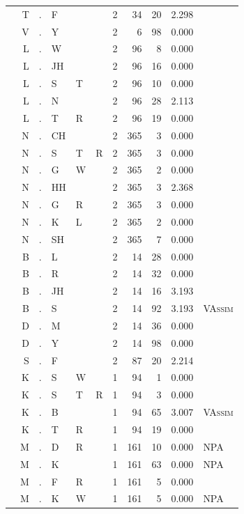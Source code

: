 \documentclass[12pt]{article}
\begin{document}
\begin{longtable}{r@{ } r@{ } c@{ } l@{ } l@{ } l@{ } r r r r l }
 & T & . & F &  &  & 2 & 34 & 20 & 2.298 &  \\
 & V & . & Y &  &  & 2 & 6 & 98 & 0.000 &  \\
 & L & . & W &  &  & 2 & 96 & 8 & 0.000 &  \\
 & L & . & JH &  &  & 2 & 96 & 16 & 0.000 &  \\
 & L & . & S & T &  & 2 & 96 & 10 & 0.000 &  \\
 & L & . & N &  &  & 2 & 96 & 28 & 2.113 &  \\
 & L & . & T & R &  & 2 & 96 & 19 & 0.000 &  \\
 & N & . & CH &  &  & 2 & 365 & 3 & 0.000 &  \\
 & N & . & S & T & R & 2 & 365 & 3 & 0.000 &  \\
 & N & . & G & W &  & 2 & 365 & 2 & 0.000 &  \\
 & N & . & HH &  &  & 2 & 365 & 3 & 2.368 &  \\
 & N & . & G & R &  & 2 & 365 & 3 & 0.000 &  \\
 & N & . & K & L &  & 2 & 365 & 2 & 0.000 &  \\
 & N & . & SH &  &  & 2 & 365 & 7 & 0.000 &  \\
 & B & . & L &  &  & 2 & 14 & 28 & 0.000 &  \\
 & B & . & R &  &  & 2 & 14 & 32 & 0.000 &  \\
 & B & . & JH &  &  & 2 & 14 & 16 & 3.193 &  \\
 & B & . & S &  &  & 2 & 14 & 92 & 3.193 & \textsc{VAssim} \\
 & D & . & M &  &  & 2 & 14 & 36 & 0.000 &  \\
 & D & . & Y &  &  & 2 & 14 & 98 & 0.000 &  \\
 & S & . & F &  &  & 2 & 87 & 20 & 2.214 &  \\
 & K & . & S & W &  & 1 & 94 & 1 & 0.000 &  \\
 & K & . & S & T & R & 1 & 94 & 3 & 0.000 &  \\
 & K & . & B &  &  & 1 & 94 & 65 & 3.007 & \textsc{VAssim} \\
 & K & . & T & R &  & 1 & 94 & 19 & 0.000 &  \\
 & M & . & D & R &  & 1 & 161 & 10 & 0.000 & \textsc{NPA} \\
 & M & . & K &  &  & 1 & 161 & 63 & 0.000 & \textsc{NPA} \\
 & M & . & F & R &  & 1 & 161 & 5 & 0.000 &  \\
 & M & . & K & W &  & 1 & 161 & 5 & 0.000 & \textsc{NPA} \\

\end{longtable}
\end{document}
